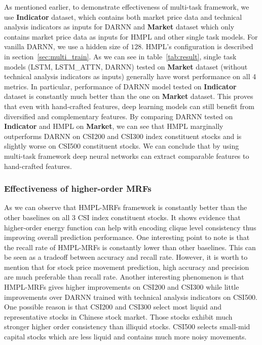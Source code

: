\documentclass[sigconf,anonymous,review]{acmart}
\begin{document}
As mentioned earlier, to demonstrate effectiveness of multi-task
framework, we use \textbf{Indicator} dataset, which contains both
market price data and technical analysis indicators as inputs for
DARNN and \textbf{Market} dataset which only contains market
price data as inputs for HMPL and other single task models. For
vanilla DARNN, we use a hidden size of $128$. HMPL's
configuration is described in section~\ref{sec:multi_train}. As
we can see in table~\ref{tab:result}, single task models (LSTM,
LSTM\_ATTN, DARNN) tested on \textbf{Market} dataset (without
technical analysis indicators as inputs) generally have worst
performance on all 4 metrics. In particular, performance of DARNN
model tested on \textbf{Indicator} dataset is constantly much
better than the one on \textbf{Market} dataset. This proves that
even with hand-crafted features, deep learning models can still
benefit from diversified and complementary features. By comparing
DARNN tested on \textbf{Indicator} and HMPL on \textbf{Market},
we can see that HMPL marginally outperforms DARNN on CSI200 and
CSI300 index constituent stocks and is slightly worse on CSI500
constituent stocks. We can conclude that by using multi-task
framework deep neural networks can extract comparable features to
hand-crafted features.

\subsubsection{Effectiveness of higher-order MRFs}

As we can observe that HMPL-MRFs framework is constantly better
than the other baselines on all 3 CSI index constituent stocks.
It shows evidence that higher-order energy function can help with
encoding clique level consistency thus improving overall
prediction performance. One interesting point to note is that the
recall rate of HMPL-MRFs is constantly lower than other
baselines. This can be seen as a tradeoff between accuracy and
recall rate. However, it is worth to mention that for stock price
movement prediction, high accuracy and precision are much
preferable than recall rate. Another interesting phenomenon is
that HMPL-MRFs gives higher improvements on CSI200 and CSI300
while little improvements over DARNN trained with technical
analysis indicators on CSI500. One possible reason is that CSI200
and CSI300 select most liquid and representative stocks in
Chinese stock market. Those stocks exhibit much stronger higher
order consistency than illiquid stocks. CSI500 selects small-mid
capital stocks which are less liquid and contains much more noisy
movements.
\end{document}
